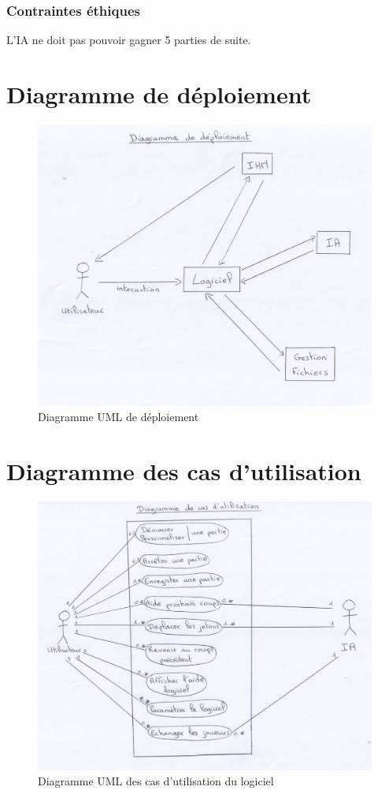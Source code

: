 \documentclass[a4paper,12pt]{article}
\begin{document}
\subsubsection{Contraintes éthiques}

L'IA ne doit pas pouvoir gagner 5 parties de suite.

\appendix
\appendixpage
\addappheadtotoc 

\section{Diagramme de déploiement}
\label{A}
\begin{figure}[H]
  \includegraphics[scale=0.8]{deploiement.jpeg}
\caption{Diagramme UML de déploiement}
\label{deploi}
\end{figure}

\section{Diagramme des cas d'utilisation}
\label{B}
\begin{figure}[H]
  \includegraphics[scale=0.7]{cas-utilisation.jpeg}
\caption{Diagramme UML des cas d'utilisation du logiciel}
\label{cas}
\end{figure}
\end{document}
